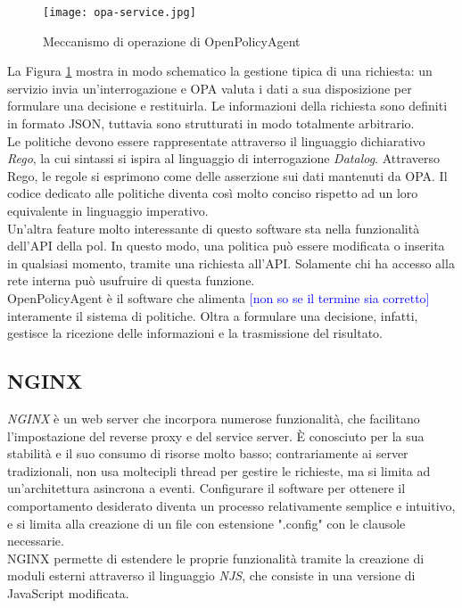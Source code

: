 \begin{figure}[h]
    \texttt{[image: opa-service.jpg]}
    \centering
    \caption{Meccanismo di operazione di OpenPolicyAgent}
    \label{OPAWork}
\end{figure} 
La Figura \ref*{OPAWork} mostra in modo schematico la gestione tipica di una richiesta: un servizio invia un'interrogazione e OPA valuta i dati a sua disposizione per formulare una decisione e restituirla. 
Le informazioni della richiesta sono definiti in formato JSON, tuttavia sono strutturati in modo totalmente arbitrario. 
\\ Le politiche devono essere rappresentate attraverso il linguaggio dichiarativo 
\textit{Rego}, la cui sintassi si ispira al linguaggio 
di interrogazione \textit{Datalog}. 
Attraverso Rego, le regole si esprimono come delle asserzione sui dati mantenuti da OPA.
Il codice dedicato alle politiche diventa così molto conciso rispetto ad un loro equivalente in 
linguaggio imperativo. 
\\ Un'altra feature molto interessante di questo software sta nella funzionalità dell'API della pol. In questo modo, una politica può essere modificata o inserita 
in qualsiasi momento, tramite una richiesta all'API. Solamente chi ha accesso alla rete interna può usufruire di questa funzione. 
\\ OpenPolicyAgent è il software che alimenta \textcolor{blue}{[non so se il termine sia corretto]} interamente il sistema di politiche. Oltra a formulare una decisione,
 infatti, gestisce la ricezione delle informazioni e la trasmissione del risultato.  


\subsection{NGINX}
\textit{NGINX} è un web server che incorpora numerose funzionalità, che facilitano l'impostazione del reverse proxy e del 
service server. 
È conosciuto per la sua stabilità e il suo consumo di risorse molto basso; contrariamente ai server tradizionali,  
non usa moltecipli thread per gestire le richieste, ma si limita ad un'architettura asincrona a eventi. Configurare il software per ottenere il comportamento desiderato diventa un processo relativamente semplice e intuitivo, e si
 limita alla creazione di un file con estensione ".config" con le clausole necessarie. 
 \\ NGINX permette di estendere le proprie funzionalità tramite la creazione di moduli esterni attraverso il linguaggio \textit{NJS}, 
 che consiste in una versione di JavaScript modificata. 


